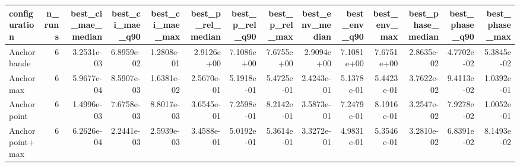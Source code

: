 \begin{tabular}{lrrrrrrrrrrrrr}
\toprule
configuration & n_runs & best_ci_mae_median & best_ci_mae_q90 & best_ci_mae_max & best_p_rel_median & best_p_rel_q90 & best_p_rel_max & best_env_median & best_env_q90 & best_env_max & best_phase_median & best_phase_q90 & best_phase_max \\
\midrule
Anchor bande & 6 & 3.2531e-03 & 6.8959e-02 & 1.2808e-01 & 2.9126e+00 & 7.1086e+00 & 7.6755e+00 & 2.9094e+00 & 7.1081e+00 & 7.6751e+00 & 2.8635e-02 & 4.7702e-02 & 5.3845e-02 \\
Anchor max & 6 & 5.9677e-04 & 8.5907e-03 & 1.6381e-02 & 2.5670e-01 & 5.1918e-01 & 5.4725e-01 & 2.4243e-01 & 5.1378e-01 & 5.4423e-01 & 3.7622e-02 & 9.4113e-02 & 1.0392e-01 \\
Anchor point & 6 & 1.4996e-03 & 7.6758e-03 & 8.8017e-03 & 3.6545e-01 & 7.2598e-01 & 8.2142e-01 & 3.5873e-01 & 7.2479e-01 & 8.1916e-01 & 3.2547e-02 & 7.9278e-02 & 1.0052e-01 \\
Anchor point+max & 6 & 6.2626e-04 & 2.2441e-03 & 2.5939e-03 & 3.4588e-01 & 5.0192e-01 & 5.3614e-01 & 3.3272e-01 & 4.9831e-01 & 5.3546e-01 & 3.2810e-02 & 6.8391e-02 & 8.1493e-02 \\
\bottomrule
\end{tabular}
